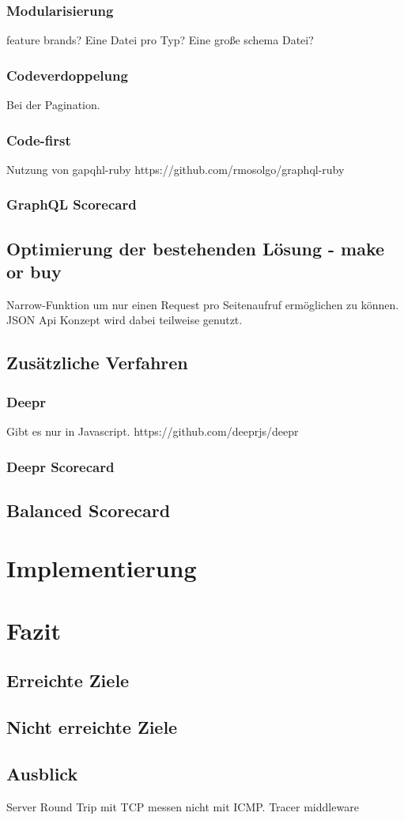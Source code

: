 \subsection{Modularisierung}
feature brands?
Eine Datei pro Typ?
Eine große schema Datei?
\subsection{Codeverdoppelung}
Bei der Pagination.
\subsection{Code-first}
Nutzung von gapqhl-ruby
https://github.com/rmosolgo/graphql-ruby
\subsection{GraphQL Scorecard}
\section{Optimierung der bestehenden Lösung - make or buy}
Narrow-Funktion um nur einen Request pro Seitenaufruf ermöglichen zu können. JSON Api Konzept wird dabei teilweise genutzt.
\section{Zusätzliche Verfahren}
\subsection{Deepr}
Gibt es nur in Javascript.
https://github.com/deeprjs/deepr
\subsection{Deepr Scorecard}
\section{Balanced Scorecard}
\chapter{Implementierung}

\chapter{Fazit}
\section{Erreichte Ziele}
\section{Nicht erreichte Ziele}
\section{Ausblick}
Server Round Trip mit TCP messen nicht mit ICMP. Tracer middleware
